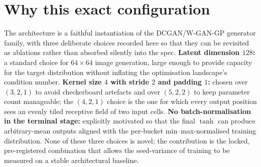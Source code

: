 \section*{Why this exact configuration}

The architecture is a faithful instantiation of the DCGAN/W-GAN-GP
generator family, with three deliberate choices recorded here so that
they can be revisited as ablations rather than absorbed silently into
the spec. \textbf{Latent dimension $128$:} a standard choice for
$64 \times 64$ image generation, large enough to provide capacity for
the target distribution without inflating the optimisation landscape's
condition number. \textbf{Kernel size $4$ with stride $2$ and padding
$1$:} chosen over $(3, 2, 1)$ to avoid checkerboard artefacts and over
$(5, 2, 2)$ to keep parameter count manageable; the $(4, 2, 1)$ choice
is the one for which every output position sees an evenly tiled
receptive field of two input cells. \textbf{No batch-normalisation in
the terminal stage:} explicitly motivated so that the final $\tanh$
can produce arbitrary-mean outputs aligned with the per-bucket
min--max-normalised training distribution. None of these three choices
is novel; the contribution is the locked, pre-registered combination
that allows the seed-variance of training to be measured on a stable
architectural baseline.
